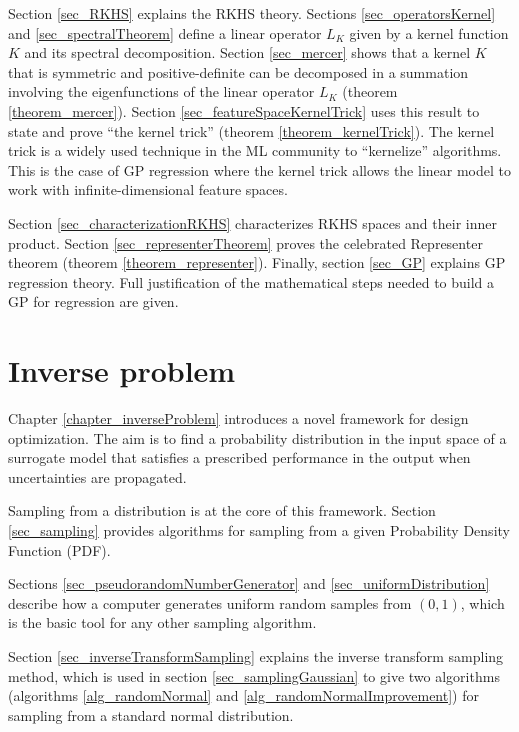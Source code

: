 Section \ref{sec_RKHS} explains the RKHS theory. 
Sections \ref{sec_operatorsKernel} and \ref{sec_spectralTheorem} define a linear operator $L_K$ given by a kernel function $K$ and its spectral decomposition. 
Section \ref{sec_mercer} shows that a kernel $K$ that is symmetric and positive-definite can be decomposed in a summation involving the eigenfunctions of the linear operator $L_K$ (theorem \ref{theorem_mercer}). 
Section \ref{sec_featureSpaceKernelTrick} uses this result to state and prove ``the kernel trick'' (theorem \ref{theorem_kernelTrick}). 
The kernel trick is a widely used technique in the ML community to ``kernelize'' algorithms. 
This is the case of GP regression where the kernel trick allows the linear model to work with infinite-dimensional feature spaces.%

Section \ref{sec_characterizationRKHS} characterizes RKHS spaces and their inner product. 
Section \ref{sec_representerTheorem} proves the celebrated Representer theorem (theorem \ref{theorem_representer}).
Finally, section \ref{sec_GP} explains GP regression theory.%
Full justification of the mathematical steps needed to build a GP for regression are given.%

\section{Inverse problem}

Chapter \ref{chapter_inverseProblem} introduces a novel framework for design optimization.%
The aim is to find a probability distribution in the input space of a surrogate model that satisfies a prescribed performance in the output when uncertainties are propagated.

Sampling from a distribution is at the core of this framework.
Section \ref{sec_sampling} provides algorithms for sampling from a given Probability Density Function (PDF).

Sections \ref{sec_pseudorandomNumberGenerator} and \ref{sec_uniformDistribution} describe how a computer generates uniform random samples from $(0,1)$, which is the basic tool for any other sampling algorithm.

Section \ref{sec_inverseTransformSampling} explains the inverse transform sampling method, which is used in section \ref{sec_samplingGaussian} to give two algorithms (algorithms \ref{alg_randomNormal} and \ref{alg_randomNormalImprovement}) for sampling from a standard normal distribution.


